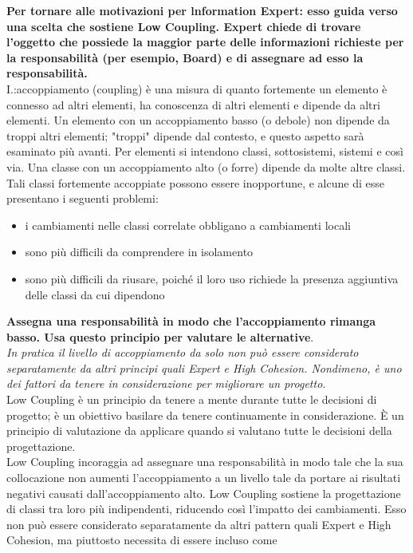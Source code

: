 \documentclass[a4paper,12pt, oneside]{book}
\begin{document}
\begin{enumerate}
\begin{center}
\end{center}
\textbf{Per tornare alle motivazioni per lnformation Expert: esso guida verso una scelta che
sostiene Low Coupling. Expert chiede di trovare l'oggetto che possiede la maggior parte
delle informazioni richieste per la responsabilità (per esempio, Board) e di assegnare ad
esso la responsabilità.}\\
I.:accoppiamento (coupling) è una misura di quanto fortemente un elemento è connesso ad altri elementi, ha conoscenza di altri elementi e dipende da altri elementi. Un
elemento con un accoppiamento basso (o debole) non dipende da troppi altri elementi;
"troppi" dipende dal contesto, e questo aspetto sarà esaminato più avanti. Per elementi si
intendono classi, sottosistemi, sistemi e così via.
Una classe con un accoppiamento alto (o forre) dipende da molte altre classi. Tali classi
fortemente accoppiate possono essere inopportune, e alcune di esse presentano i seguenti
problemi:
\begin{itemize}
\item i cambiamenti nelle classi correlate obbligano a cambiamenti locali
\item sono più difficili da comprendere in isolamento
\item sono più difficili da riusare, poiché il loro uso richiede la presenza aggiuntiva delle
classi da cui dipendono
\end{itemize}
\textbf{Assegna una responsabilità in modo che l'accoppiamento rimanga basso. Usa questo
  principio per valutare le alternative}.
\\\textit{In pratica il livello di accoppiamento da solo non può essere considerato separatamente
da altri principi quali Expert e High Cohesion. Nondimeno, è uno dei fattori da tenere
in considerazione per migliorare un progetto.}\\
Low Coupling è un principio da tenere a mente durante tutte le decisioni di progetto;
è un obiettivo basilare da tenere continuamente in considerazione. È un principio di
valutazione da applicare quando si valutano tutte le decisioni della progettazione.\\Low Coupling incoraggia ad assegnare una responsabilità in modo tale che la sua collocazione non aumenti l'accoppiamento a un livello tale da portare ai risultati negativi
causati dall'accoppiamento alto.
Low Coupling sostiene la progettazione di classi tra loro più indipendenti, riducendo
così l'impatto dei cambiamenti. Esso non può essere considerato separatamente da altri
pattern quali Expert e High Cohesion, ma piuttosto necessita di essere incluso come

\end{enumerate}
\end{document}
